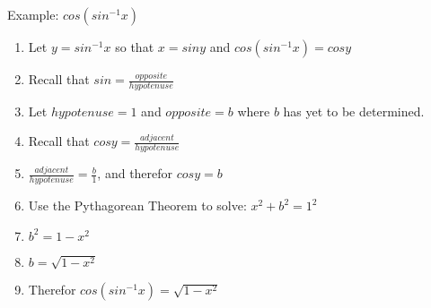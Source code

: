 \documentclass{article}
\begin{document}
\noindent
Example: $cos(sin^{-1}x)$
\begin{enumerate}
  \item {Let $y = sin^{-1}x$ so that $x = siny$ and $cos(sin^{-1}x) = cosy$\\}
  \item {Recall that $sin = \frac{opposite}{hypotenuse}$\\}
  \item {Let $hypotenuse = 1$ and $opposite = b$ where $b$ has yet to be determined.\\}
  \item {Recall that $cosy = \frac{adjacent}{hypotenuse}$\\}
  \item {$\frac{adjacent}{hypotenuse} = \frac{b}{1}$, and therefor $cosy = b$\\}
  \item {Use the Pythagorean Theorem to solve: $x^2 + b^2 = 1^2$\\}
  \item {$b^2 = 1 - x^2$\\}
  \item {$b = \sqrt{1 - x^2}$\\}
  \item {Therefor $cos(sin^{-1}x) = \sqrt{1 - x^2}$}
\end{enumerate}
\end{document}
